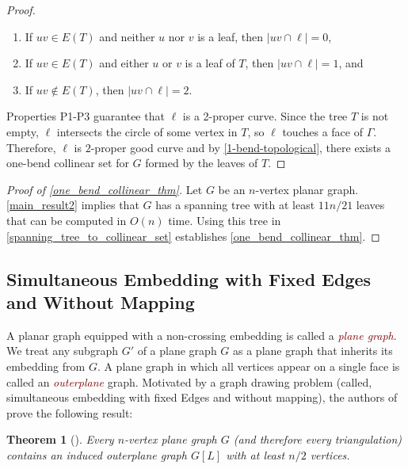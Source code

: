 \documentclass[a4paper,UKenglish, cleveref, autoref, thm-restate]{lipics-v2021}
\newtheorem{thm}{Theorem}
\newcommand{\defin}[1]{\emph{\textcolor{Maroon}{#1}}}
\begin{document}
\begin{proof}
    \begin{enumerate}
        \item [(P1)] If $uv \in E(T)$ and neither $u$ nor $v$ is a leaf, then $|uv \cap \ell| = 0$,

        \item [(P2)] If $uv \in E(T)$ and either $u$ or $v$ is a leaf of $T$, then $|uv \cap \ell| = 1$, and

        \item [(P3)] If $uv \notin E(T)$, then $|uv \cap \ell| = 2$.
    \end{enumerate}

    Properties P1-P3 guarantee that $\ell$ is a 2-proper curve. Since the tree $T$ is not empty, $\ell$ intersects the circle of some vertex in $T$, so $\ell$ touches a face of $\Gamma$. Therefore, $\ell$ is $2$-proper good curve and by \cref{1-bend-topological}, there exists a one-bend collinear set for $G$ formed by the leaves of $T$.
\end{proof}

\begin{proof}[Proof of \cref{one_bend_collinear_thm}]
Let $G$ be an $n$-vertex planar graph. \cref{main_result2} implies that $G$ has a spanning tree with at least $11n/21$ leaves that can be computed in $O(n)$ time. Using this tree in \cref{spanning_tree_to_collinear_set} establishes \cref{one_bend_collinear_thm}.
\end{proof}

\subsection{Simultaneous Embedding with Fixed Edges and Without Mapping}

A planar graph equipped with a non-crossing embedding is called a \defin{plane graph}.  We treat any subgraph $G'$ of a plane graph $G$ as a plane graph that inherits its embedding from $G$. A plane graph in which all vertices appear on a single face is called an \defin{outerplane} graph.  Motivated by a graph drawing problem (called, simultaneous embedding with fixed Edges and without mapping), the authors of \cite{angelini.evans.ea:sefe} prove the following result:

\begin{thm}[\cite{angelini.evans.ea:sefe}]
\label{induced_outerplane_orig}
    Every $n$-vertex plane graph $G$ (and therefore every triangulation) contains an induced outerplane graph $G[L]$ with at least $n/2$ vertices.
\end{thm}
\end{document}
